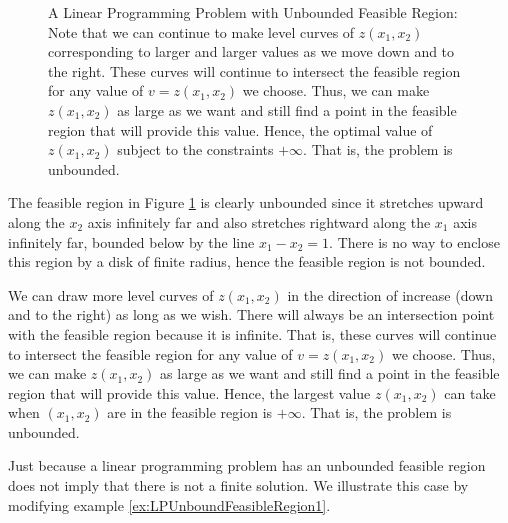 \begin{solution}
\begin{figure}[H]
\begin{center}
\begin{tikzpicture}[scale = 1.5]
\end{tikzpicture}
\end{center}
\caption{A Linear Programming Problem with Unbounded Feasible Region: Note that we can continue to make level curves of $z(x_1,x_2)$ corresponding to larger and larger values as we move down and to the right. These curves will continue to intersect the feasible region for any value of $v = z(x_1,x_2)$ we choose. Thus, we can make $z(x_1,x_2)$ as large as we want and still find a point in the feasible region that will provide this value. Hence, the optimal value of $z(x_1,x_2)$ subject to the constraints $+\infty$. That is, the problem is unbounded.}
\label{fig:LPUnboundFeasibleRegion1}
\end{figure}
The feasible region in Figure \ref{fig:LPUnboundFeasibleRegion1} is clearly unbounded since it stretches upward along the $x_2$ axis infinitely far and also stretches rightward along the $x_1$ axis infinitely far, bounded below by the line $x_1-x_2 = 1$. There is no way to enclose this region by a disk of finite radius, hence the feasible region is not bounded. 

We can draw more level curves of $z(x_1,x_2)$  in the direction of increase (down and to the right) as long as we wish. There will always be an intersection point with the feasible region because it is infinite. That is, these curves will continue to intersect the feasible region for any value of $v = z(x_1,x_2)$ we choose. Thus, we can make $z(x_1,x_2)$ as large as we want and still find a point in the feasible region that will provide this value. Hence, the largest value $z(x_1,x_2)$ can take when $(x_1,x_2)$ are in the feasible region is $+\infty$. That is, the problem is unbounded.
\label{ex:LPUnboundFeasibleRegion1}
\end{solution}

Just because a linear programming problem has an unbounded feasible region does not imply that there is not a finite solution. We illustrate this case by modifying example \ref{ex:LPUnboundFeasibleRegion1}. 

